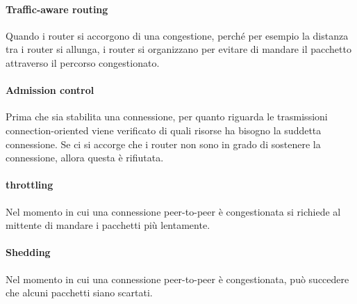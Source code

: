\documentclass{article}
\begin{document}
\paragraph{Traffic-aware routing}
Quando i router si accorgono di una congestione, perché per esempio la distanza
tra i router si allunga, i router si organizzano per evitare di mandare il
pacchetto attraverso il percorso congestionato.\\

\paragraph{Admission control}
Prima che sia stabilita una connessione, per quanto riguarda le trasmissioni
connection-oriented viene verificato di quali risorse ha bisogno la suddetta
connessione. Se ci si accorge che i router non sono in grado di sostenere la
connessione, allora questa è rifiutata.\\

\paragraph{throttling}
Nel momento in cui una connessione peer-to-peer è congestionata si richiede al 
mittente di mandare i pacchetti più lentamente. 

\paragraph{Shedding}
Nel momento in cui una connessione peer-to-peer è congestionata, può succedere
che alcuni pacchetti siano scartati.\\
\end{document}
